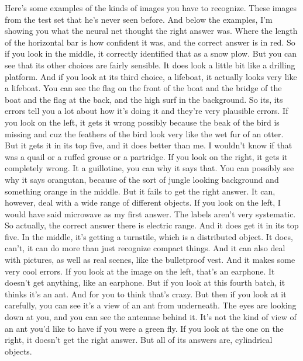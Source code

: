 \begin{multicols}{2}
\begin{footnotesize}
Here's some examples of the kinds of images you have to recognize. These images from the test set that he's never seen before. And below the examples, I'm showing you what the neural net thought the right answer was. Where the length of the horizontal bar is how confident it was, and the correct answer is in red. So if you look in the middle, it correctly identified that as a snow plow. But you can see that its other choices are fairly sensible. It does look a little bit like a drilling platform. And if you look at its third choice, a lifeboat, it actually looks very like a lifeboat. You can see the flag on the front of the boat and the bridge of the boat and the flag at the back, and the high surf in the background. So its, its errors tell you a lot about how it's doing it and they're very plausible errors. If you look on the left, it gets it wrong possibly because the beak of the bird is missing and cuz the feathers of the bird look very like the wet fur of an otter. But it gets it in its top five, and it does better than me. I wouldn't know if that was a quail or a ruffed grouse or a partridge. If you look on the right, it gets it completely wrong. It a guillotine, you can why it says that. You can possibly see why it says orangutan, because of the sort of jungle looking background and something orange in the middle. But it fails to get the right answer. It can, however, deal with a wide range of different objects. If you look on the left, I would have said microwave as my first answer. The labels aren't very systematic. So actually, the correct answer there is electric range. And it does get it in its top five. In the middle, it's getting a turnstile, which is a distributed object. It does, can't, it can do more than just recognize compact things. And it can also deal with pictures, as well as real scenes, like the bulletproof vest. And it makes some very cool errors. If you look at the image on the left, that's an earphone. It doesn't get anything, like an earphone. But if you look at this fourth batch, it thinks it's an ant. And for you to think that's crazy. But then if you look at it carefully, you can see it's a view of an ant from underneath. The eyes are looking down at you, and you can see the antennae behind it. It's not the kind of view of an ant you'd like to have if you were a green fly. If you look at the one on the right, it doesn't get the right answer. But all of its answers are, cylindrical objects.


\end{footnotesize}
\end{multicols}

